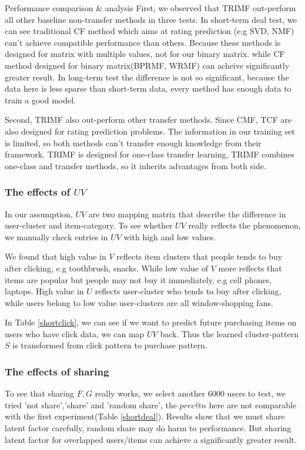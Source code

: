 \begin{section}{Performance comparison \& analysis}
First, we observed that TRIMF out-perform all other baseline non-transfer methods in three tests. In short-term deal test, we can see traditional CF method which aims at rating prediction (e.g SVD, NMF) can't achieve compatible performance than others. Because these methods is designed for matrix with multiple values, not for our binary matrix. while CF method designed for binary matrix(BPRMF, WRMF) can acheive significantly greater result. In long-term test the difference is not so significant, because the data here is less sparse than short-term data, every method has enough data to train a good model.

Second, TRIMF also out-perform other transfer methods. Since CMF, TCF are also designed for rating prediction problems. The information in our training set is limited, so both methods can't transfer enough knowledge from their framework. TRIMF is designed for one-class transfer learning, TRIMF combines one-class and transfer methods, so it inherits advantages from both side.

  \subsubsection{The effects of $UV$}
In our assumption, $UV$ are two mapping matrix that describe the difference in user-cluster and item-category. To see whether $UV$ really reflects the phenomenon, we manually check entries in $UV$ with high and low values.

  We found that high value in $V$ reflects item clusters that people tends to buy after clicking, e.g toothbrush, snacks. While low value of $V$ more reflects that items are popular but people may not buy it immediately, e.g cell phones, laptops. High value in $U$ reflects user-cluster who tends to buy after clicking, while users belong to low value user-clusters are all window-shopping fans.

  In Table \ref{shortclick}, we can see if we want to predict future purchasing items on users who have click data, we can map $UV$ back. Thus the learned cluster-pattern $S$ is transformed from click pattern to purchase pattern.

  \subsubsection{The effects of sharing}
    To see that sharing $F,G$ really works, we select another 6000 users to test, we tried 'not share','share' and 'random share', the $prec@n$ here are not comparable with the first experiment(Table \ref{shortdeal}). Results show that we must share latent factor carefully, random share may do harm to performance. But sharing latent factor for overlapped users/items can achieve a significantly greater result.


\end{section}
